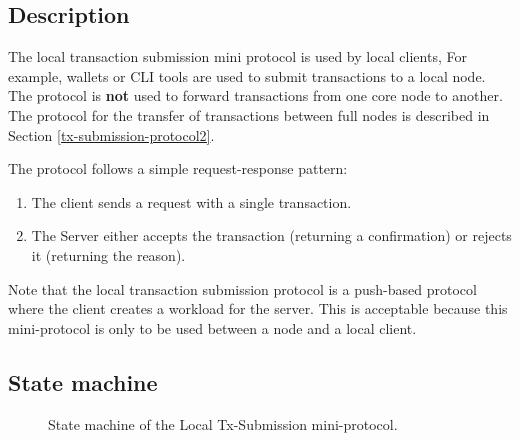 \subsection{Description}
The local transaction submission mini protocol is used by local clients,
For example, wallets or CLI tools are used to submit transactions to a local node.
The protocol is {\bf not} used to forward transactions from one core node to another.
The protocol for the transfer of transactions between full nodes
is described in Section \ref{tx-submission-protocol2}.

The protocol follows a simple request-response pattern:
\begin{enumerate}
\item The client sends a request with a single transaction.
\item The Server either accepts the transaction (returning a confirmation) or rejects it (returning the
  reason).
\end{enumerate}
Note that the local transaction submission protocol is a push-based protocol where the client
creates a workload for the server.
This is acceptable because this mini-protocol is only to be used between a node and a local client.
\newcommand{\MsgSubmitTx}{\msg{MsgSubmitTx}}
\newcommand{\MsgAcceptTx}{\msg{MsgAcceptTx}}
\newcommand{\MsgRejectTx}{\msg{MsgRejectTx}}

\subsection{State machine}
\begin{figure}[h]
\caption{State machine of the Local Tx-Submission mini-protocol.}
\end{figure}

